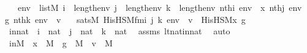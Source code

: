 \begin{isabellebody}
\ \ \ {\isachardoublequoteopen}env\ {\isasymin}\ list{\isacharparenleft}{\kern0pt}M{\isacharparenright}{\kern0pt}{\isachardoublequoteclose}\ {\isachardoublequoteopen}i\ {\isacharless}{\kern0pt}\ length{\isacharparenleft}{\kern0pt}env{\isacharparenright}{\kern0pt}{\isachardoublequoteclose}\ {\isachardoublequoteopen}j\ {\isacharless}{\kern0pt}\ length{\isacharparenleft}{\kern0pt}env{\isacharparenright}{\kern0pt}{\isachardoublequoteclose}\ {\isachardoublequoteopen}k\ {\isacharless}{\kern0pt}\ length{\isacharparenleft}{\kern0pt}env{\isacharparenright}{\kern0pt}{\isachardoublequoteclose}\ {\isachardoublequoteopen}nth{\isacharparenleft}{\kern0pt}i{\isacharcomma}{\kern0pt}\ env{\isacharparenright}{\kern0pt}\ {\isacharequal}{\kern0pt}\ x{\isacharprime}{\kern0pt}{\isachardoublequoteclose}\ {\isachardoublequoteopen}nth{\isacharparenleft}{\kern0pt}j{\isacharcomma}{\kern0pt}\ env{\isacharparenright}{\kern0pt}\ {\isacharequal}{\kern0pt}\ g{\isachardoublequoteclose}\ {\isachardoublequoteopen}nth{\isacharparenleft}{\kern0pt}k{\isacharcomma}{\kern0pt}\ env{\isacharparenright}{\kern0pt}\ {\isacharequal}{\kern0pt}\ v{\isachardoublequoteclose}\isanewline
\ \ \ {\isachardoublequoteopen}sats{\isacharparenleft}{\kern0pt}M{\isacharcomma}{\kern0pt}\ His{\isacharunderscore}{\kern0pt}HS{\isacharunderscore}{\kern0pt}M{\isacharunderscore}{\kern0pt}fm{\isacharparenleft}{\kern0pt}i{\isacharcomma}{\kern0pt}\ j{\isacharcomma}{\kern0pt}\ k{\isacharparenright}{\kern0pt}{\isacharcomma}{\kern0pt}\ env{\isacharparenright}{\kern0pt}\ {\isasymlongleftrightarrow}\ v\ {\isacharequal}{\kern0pt}\ His{\isacharunderscore}{\kern0pt}HS{\isacharunderscore}{\kern0pt}M{\isacharparenleft}{\kern0pt}x{\isacharprime}{\kern0pt}{\isacharcomma}{\kern0pt}\ g{\isacharparenright}{\kern0pt}{\isachardoublequoteclose}\ \isanewline
%
\isadelimproof
\isanewline
%
\endisadelimproof
%
\isatagproof
{}\isamarkupfalse%
\ {\isacharminus}{\kern0pt}\ \isanewline
\ \ \isamarkupfalse%
\ innat\ {\isacharcolon}{\kern0pt}\ {\isachardoublequoteopen}i\ {\isasymin}\ nat\ {\isasymand}\ j\ {\isasymin}\ nat\ {\isasymand}\ k\ {\isasymin}\ nat{\isachardoublequoteclose}\ \isamarkupfalse%
\ assms\ lt{\isacharunderscore}{\kern0pt}nat{\isacharunderscore}{\kern0pt}in{\isacharunderscore}{\kern0pt}nat\ \isamarkupfalse%
\ auto\isanewline
\ \ \isamarkupfalse%
\ inM\ {\isacharcolon}{\kern0pt}\ {\isachardoublequoteopen}x{\isacharprime}{\kern0pt}\ {\isasymin}\ M\ {\isasymand}\ g\ {\isasymin}\ M\ {\isasymand}\ v\ {\isasymin}\ M{\isachardoublequoteclose}\ \isamarkupfalse%

\end{isabellebody}
